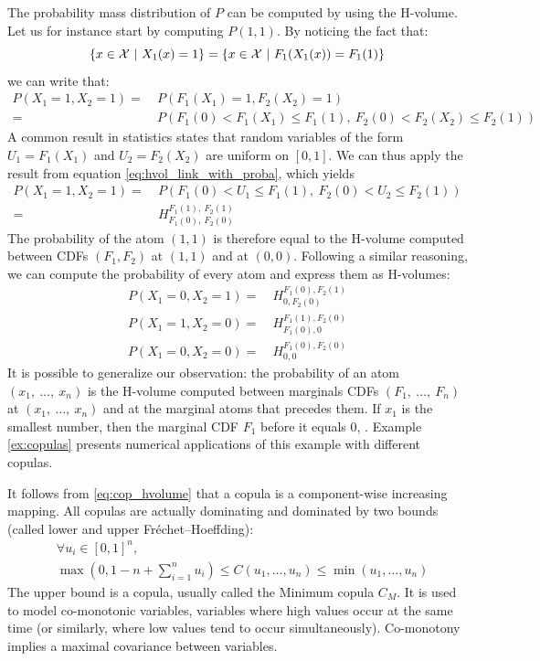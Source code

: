 \begin{example}
    The probability mass distribution of $P$ can be computed by using the H-volume. Let us for instance start by computing $P(1,1)$. By noticing the fact that:
    \begin{equation*}
        \{x\in{\mathcal{X}}~|~X_1(x)=1\}=\{x\in{\mathcal{X}}~|~F_1(X_1(x))=F_1(1)\}
    \end{equation*}
    we can write that:
    \begin{align*}
        P(X_1 = 1, X_2=1) =& ~P(F_1(X_1)= 1, F_2(X_2) = 1)\\
        =& ~P(F_1(0) < F_1(X_1)\leqslant F_1(1), ~F_2(0) < F_2(X_2)\leqslant F_2(1))
    \end{align*}
    A common result in statistics states that random variables of the form $U_1=F_1(X_1)$ and $U_2=F_2(X_2)$ are uniform on $[0,1]$. We can thus apply the result from equation \eqref{eq:hvol_link_with_proba}, which yields
    \begin{align*}
        P(X_1 = 1, X_2=1) =& ~P(F_1(0) < U_1 \leqslant F_1(1), ~F_2(0) < U_2 \leqslant F_2(1))\\
        =& ~H^{F_1(1),~F_2(1)}_{F_1(0),~F_2(0)}
    \end{align*}
    The probability of the atom $(1,1)$ is therefore equal to the H-volume computed between CDFs $(F_1, F_2)$ at $(1, 1)$ and at $(0,0)$. Following a similar reasoning, we can compute the probability of every atom and express them as H-volumes:
    \begin{align*}
        P(X_1=0, X_2=1) =& ~H_{0, F_2(0)}^{F_1(0), F_2(1)}\\
        P(X_1=1, X_2=0) =& ~H_{F_1(0), 0}^{F_1(1), F_2(0)}\\
        P(X_1=0, X_2=0) =& ~H_{0,0}^{F_1(0), F_2(0)}
    \end{align*}
    It is possible to generalize our observation: the probability of an atom $(x_1,~\dots,~x_n)$ is the H-volume computed between marginals CDFs $(F_1,~\dots,~F_n)$ at $(x_1,~\dots,~x_n)$ and at the marginal atoms that precedes them. If $x_1$ is the smallest number, then the marginal CDF $F_1$ before it equals $0$, \etc.
    Example \ref{ex:copulas} presents numerical applications of this example with different copulas.
\end{example}

It follows from \eqref{eq:cop_hvolume} that a copula is a component-wise increasing mapping. All copulas are actually dominating and dominated by two bounds (called lower and upper Fréchet–Hoeffding):
\begin{align}
    &\forall u_i \in [0,1]^n,\nonumber\\
    &\max(0, 1-n+\sum_{i=1}^n u_i) \leqslant C(u_1,\dots,u_n) \leqslant \min(u_1, \dots, u_n)
\end{align}
The upper bound is a copula, usually called the Minimum copula $C_M$. It is used to model co-monotonic variables, \ie variables where high values occur at the same time (or similarly, where low values tend to occur simultaneously). Co-monotony implies a maximal covariance between variables.

